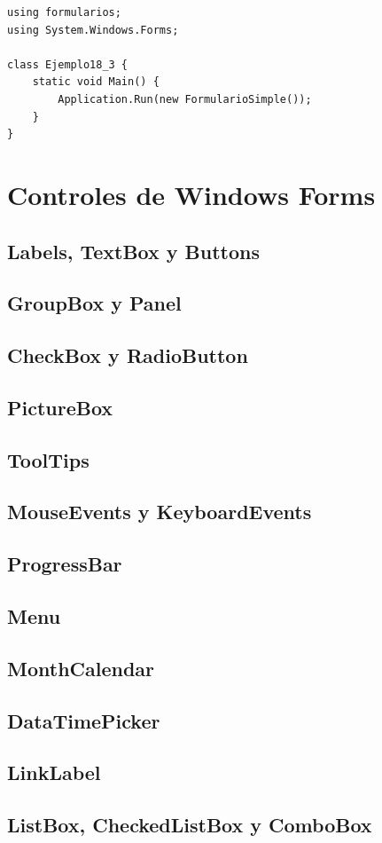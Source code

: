 \documentclass[12pt,a4paper]{report}
\begin{document}
\begin{lstlisting}
using formularios;
using System.Windows.Forms;

class Ejemplo18_3 {
	static void Main() {
		Application.Run(new FormularioSimple());
	}
}
\end{lstlisting}

\chapter{Controles de Windows Forms}
\section{Labels, TextBox y Buttons}
\section{GroupBox y Panel}
\section{CheckBox y RadioButton}
\section{PictureBox}
\section{ToolTips}
\section{MouseEvents y KeyboardEvents}
\section{ProgressBar}
\section{Menu}
\section{MonthCalendar}
\section{DataTimePicker}
\section{LinkLabel}
\section{ListBox, CheckedListBox y ComboBox}
\end{document}
